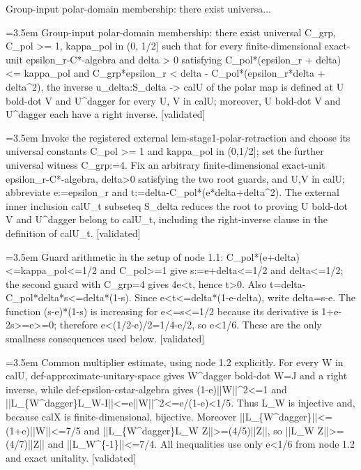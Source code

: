 \documentclass{article}
\newcommand{\step}[1]{\par\noindent\hangindent=3.5em\hangafter=1%
  \makebox[3.5em][l]{\textbf{#1.}}}
\newcommand{\steptag}[1]{\hfill{\small\textsf{[#1]}}}
\begin{document}
\begin{proofbox}{Group-input polar-domain membership: there exist universa...}
\step{1} Group-input polar-domain membership: there exist universal C\_grp, C\_pol >= 1, kappa\_pol in (0, 1/2] such that for every finite-dimensional exact-unit epsilon\_r-C*-algebra and delta > 0 satisfying C\_pol*(epsilon\_r + delta) <= kappa\_pol and C\_grp*epsilon\_r < delta - C\_pol*(epsilon\_r*delta + delta\textasciicircum{}2), the inverse u\_delta:S\_delta -> calU of the polar map is defined at U bold-dot V and U\textasciicircum{}dagger for every U, V in calU; moreover, U bold-dot V and U\textasciicircum{}dagger each have a right inverse. \steptag{validated} \\[6pt]
\step{1.1} Invoke the registered external lem-stage1-polar-retraction and choose its universal constants C\_pol >= 1 and kappa\_pol in (0,1/2]; set the further universal witness C\_grp:=4. Fix an arbitrary finite-dimensional exact-unit epsilon\_r-C*-algebra, delta>0 satisfying the two root guards, and U,V in calU; abbreviate e:=epsilon\_r and t:=delta-C\_pol*(e*delta+delta\textasciicircum{}2). The external inner inclusion calU\_t subseteq S\_delta reduces the root to proving U bold-dot V and U\textasciicircum{}dagger belong to calU\_t, including the right-inverse clause in the definition of calU\_t. \steptag{validated} \\[4pt]
\step{1.2} Guard arithmetic in the setup of node 1.1: C\_pol*(e+delta)<=kappa\_pol<=1/2 and C\_pol>=1 give s:=e+delta<=1/2 and delta<=1/2; the second guard with C\_grp=4 gives 4e<t, hence t>0. Also t=delta-C\_pol*delta*s<=delta*(1-s). Since e<t<=delta*(1-e-delta), write delta=s-e. The function (s-e)*(1-s) is increasing for e<=s<=1/2 because its derivative is 1+e-2s>=e>=0; therefore e<(1/2-e)/2=1/4-e/2, so e<1/6. These are the only smallness consequences used below. \steptag{validated} \\[4pt]
\step{1.3} Common multiplier estimate, using node 1.2 explicitly. For every W in calU, def-approximate-unitary-space gives W\textasciicircum{}dagger bold-dot W=J and a right inverse, while def-epsilon-cstar-algebra gives (1-e)||W||\textasciicircum{}2<=1 and ||L\_\{W\textasciicircum{}dagger\}L\_W-I||<=e||W||\textasciicircum{}2<=e/(1-e)<1/5. Thus L\_W is injective and, because calX is finite-dimensional, bijective. Moreover ||L\_\{W\textasciicircum{}dagger\}||<=(1+e)||W||<=7/5 and ||L\_\{W\textasciicircum{}dagger\}L\_W Z||>=(4/5)||Z||, so ||L\_W Z||>=(4/7)||Z|| and ||L\_W\textasciicircum{}\{-1\}||<=7/4. All inequalities use only e<1/6 from node 1.2 and exact unitality. \steptag{validated} \\[4pt]

\end{proofbox}
\end{document}
